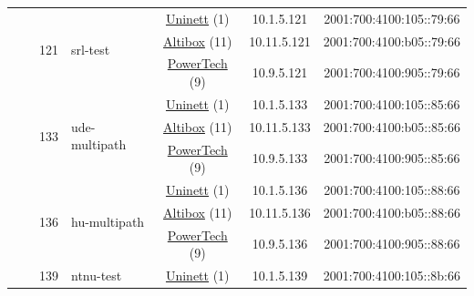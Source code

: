 \begin{small}
\begin{center}
\begin{longtable}{|c|c|c|c|c|c|c|c|}
  &  & \multirow{3}{*}{\tiny{121}} & \multicolumn{1}{|l|}{\multirow{3}{*}{\tiny{srl-test}}} & \multicolumn{2}{|c|}{\tiny{\href{https://www.uninett.no}{Uninett} (1)}} & \tiny{10.1.5.121} & \tiny{2001:700:4100:105::79:66} \\* \cline{5-5}\cline{6-6}\cline{7-7}\cline{8-8}
  &  &  &  & \multicolumn{2}{|c|}{\tiny{\href{https://www.altibox.no}{Altibox} (11)}} & \tiny{10.11.5.121} & \tiny{2001:700:4100:b05::79:66} \\* \cline{5-5}\cline{6-6}\cline{7-7}\cline{8-8}
  &  &  &  & \multicolumn{2}{|c|}{\tiny{\href{http://www.powertech.no}{PowerTech} (9)}} & \tiny{10.9.5.121} & \tiny{2001:700:4100:905::79:66} \\* \cline{3-3}\cline{4-4}\cline{5-5}\cline{6-6}\cline{7-7}\cline{8-8}
  &  & \multirow{3}{*}{\tiny{133}} & \multicolumn{1}{|l|}{\multirow{3}{*}{\tiny{ude-multipath}}} & \multicolumn{2}{|c|}{\tiny{\href{https://www.uninett.no}{Uninett} (1)}} & \tiny{10.1.5.133} & \tiny{2001:700:4100:105::85:66} \\* \cline{5-5}\cline{6-6}\cline{7-7}\cline{8-8}
  &  &  &  & \multicolumn{2}{|c|}{\tiny{\href{https://www.altibox.no}{Altibox} (11)}} & \tiny{10.11.5.133} & \tiny{2001:700:4100:b05::85:66} \\* \cline{5-5}\cline{6-6}\cline{7-7}\cline{8-8}
  &  &  &  & \multicolumn{2}{|c|}{\tiny{\href{http://www.powertech.no}{PowerTech} (9)}} & \tiny{10.9.5.133} & \tiny{2001:700:4100:905::85:66} \\* \cline{3-3}\cline{4-4}\cline{5-5}\cline{6-6}\cline{7-7}\cline{8-8}
  &  & \multirow{3}{*}{\tiny{136}} & \multicolumn{1}{|l|}{\multirow{3}{*}{\tiny{hu-multipath}}} & \multicolumn{2}{|c|}{\tiny{\href{https://www.uninett.no}{Uninett} (1)}} & \tiny{10.1.5.136} & \tiny{2001:700:4100:105::88:66} \\* \cline{5-5}\cline{6-6}\cline{7-7}\cline{8-8}
  &  &  &  & \multicolumn{2}{|c|}{\tiny{\href{https://www.altibox.no}{Altibox} (11)}} & \tiny{10.11.5.136} & \tiny{2001:700:4100:b05::88:66} \\* \cline{5-5}\cline{6-6}\cline{7-7}\cline{8-8}
  &  &  &  & \multicolumn{2}{|c|}{\tiny{\href{http://www.powertech.no}{PowerTech} (9)}} & \tiny{10.9.5.136} & \tiny{2001:700:4100:905::88:66} \\* \cline{3-3}\cline{4-4}\cline{5-5}\cline{6-6}\cline{7-7}\cline{8-8}
  &  & \multirow{3}{*}{\tiny{139}} & \multicolumn{1}{|l|}{\multirow{3}{*}{\tiny{ntnu-test}}} & \multicolumn{2}{|c|}{\tiny{\href{https://www.uninett.no}{Uninett} (1)}} & \tiny{10.1.5.139} & \tiny{2001:700:4100:105::8b:66} \\* \cline{5-5}\cline{6-6}\cline{7-7}\cline{8-8}

\end{longtable}
\end{center}
\end{small}
